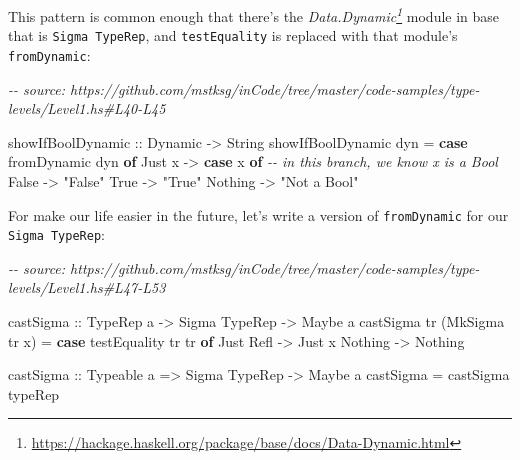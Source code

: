 \documentclass[]{article}
\newenvironment{Shaded}{}{}
\newcommand{\CommentTok}[1]{\textcolor[rgb]{0.38,0.63,0.69}{\textit{#1}}}
\newcommand{\DataTypeTok}[1]{\textcolor[rgb]{0.56,0.13,0.00}{#1}}
\newcommand{\KeywordTok}[1]{\textcolor[rgb]{0.00,0.44,0.13}{\textbf{#1}}}
\newcommand{\NormalTok}[1]{#1}
\newcommand{\OtherTok}[1]{\textcolor[rgb]{0.00,0.44,0.13}{#1}}
\newcommand{\StringTok}[1]{\textcolor[rgb]{0.25,0.44,0.63}{#1}}
\renewcommand{\href}[2]{#2\footnote{\url{#1}}}
\begin{document}
This pattern is common enough that there's the
\emph{\href{https://hackage.haskell.org/package/base/docs/Data-Dynamic.html}{Data.Dynamic}}
module in base that is \texttt{Sigma\ TypeRep}, and \texttt{testEquality} is
replaced with that module's \texttt{fromDynamic}:

\begin{Shaded}
\begin{Highlighting}[]
\CommentTok{{-}{-} source: https://github.com/mstksg/inCode/tree/master/code{-}samples/type{-}levels/Level1.hs\#L40{-}L45}

\OtherTok{showIfBoolDynamic ::} \DataTypeTok{Dynamic} \OtherTok{{-}\textgreater{}} \DataTypeTok{String}
\NormalTok{showIfBoolDynamic dyn }\OtherTok{=} \KeywordTok{case}\NormalTok{ fromDynamic dyn }\KeywordTok{of}
  \DataTypeTok{Just}\NormalTok{ x }\OtherTok{{-}\textgreater{}} \KeywordTok{case}\NormalTok{ x }\KeywordTok{of} \CommentTok{{-}{-} in this branch, we know x is a Bool}
    \DataTypeTok{False} \OtherTok{{-}\textgreater{}} \StringTok{"False"}
    \DataTypeTok{True} \OtherTok{{-}\textgreater{}} \StringTok{"True"}
  \DataTypeTok{Nothing} \OtherTok{{-}\textgreater{}} \StringTok{"Not a Bool"}
\end{Highlighting}
\end{Shaded}

For make our life easier in the future, let's write a version of
\texttt{fromDynamic} for our \texttt{Sigma\ TypeRep}:

\begin{Shaded}
\begin{Highlighting}[]
\CommentTok{{-}{-} source: https://github.com/mstksg/inCode/tree/master/code{-}samples/type{-}levels/Level1.hs\#L47{-}L53}

\OtherTok{castSigma ::} \DataTypeTok{TypeRep}\NormalTok{ a }\OtherTok{{-}\textgreater{}} \DataTypeTok{Sigma} \DataTypeTok{TypeRep} \OtherTok{{-}\textgreater{}} \DataTypeTok{Maybe}\NormalTok{ a}
\NormalTok{castSigma tr (}\DataTypeTok{MkSigma}\NormalTok{ tr\textquotesingle{} x) }\OtherTok{=} \KeywordTok{case}\NormalTok{ testEquality tr tr\textquotesingle{} }\KeywordTok{of}
  \DataTypeTok{Just} \DataTypeTok{Refl} \OtherTok{{-}\textgreater{}} \DataTypeTok{Just}\NormalTok{ x}
  \DataTypeTok{Nothing} \OtherTok{{-}\textgreater{}} \DataTypeTok{Nothing}

\OtherTok{castSigma\textquotesingle{} ::} \DataTypeTok{Typeable}\NormalTok{ a }\OtherTok{=\textgreater{}} \DataTypeTok{Sigma} \DataTypeTok{TypeRep} \OtherTok{{-}\textgreater{}} \DataTypeTok{Maybe}\NormalTok{ a}
\NormalTok{castSigma\textquotesingle{} }\OtherTok{=}\NormalTok{ castSigma typeRep}
\end{Highlighting}
\end{Shaded}
\end{document}
